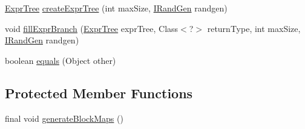 \begin{DoxyCompactItemize}
\item 
\hyperlink{classnet_1_1sf_1_1jclec_1_1exprtree_1_1_expr_tree}{Expr\-Tree} \hyperlink{classnet_1_1sf_1_1jclec_1_1exprtree_1_1_expr_tree_schema_ac6746feb1a9f6a9f42732f2b3c73660f}{create\-Expr\-Tree} (int max\-Size, \hyperlink{interfacenet_1_1sf_1_1jclec_1_1util_1_1random_1_1_i_rand_gen}{I\-Rand\-Gen} randgen)
\item 
void \hyperlink{classnet_1_1sf_1_1jclec_1_1exprtree_1_1_expr_tree_schema_a77806eaca70bdd4913227aea16b61d1a}{fill\-Expr\-Branch} (\hyperlink{classnet_1_1sf_1_1jclec_1_1exprtree_1_1_expr_tree}{Expr\-Tree} expr\-Tree, Class$<$?$>$ return\-Type, int max\-Size, \hyperlink{interfacenet_1_1sf_1_1jclec_1_1util_1_1random_1_1_i_rand_gen}{I\-Rand\-Gen} randgen)
\item 
boolean \hyperlink{classnet_1_1sf_1_1jclec_1_1exprtree_1_1_expr_tree_schema_a05be85ca80f0ad730d8ac61827035378}{equals} (Object other)
\end{DoxyCompactItemize}
\subsection*{Protected Member Functions}
\begin{DoxyCompactItemize}
\item 
final void \hyperlink{classnet_1_1sf_1_1jclec_1_1exprtree_1_1_expr_tree_schema_a2022206293d7330f674d952255ff3867}{generate\-Block\-Maps} ()
\end{DoxyCompactItemize}

